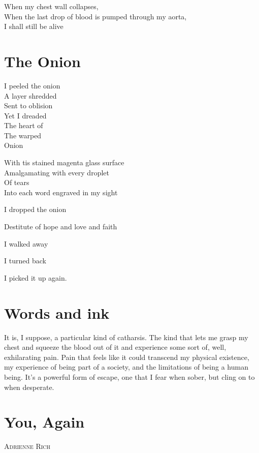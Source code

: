 \documentclass[parskip=full,12pt,oneside,openany,a5paper,numbers=endperiod]{scrbook}
\begin{document}
When my chest wall collapses,\\
When the last drop of blood is pumped through my aorta,\\
I shall still be alive

\chapter{The Onion}

I peeled the onion\\
A layer shredded\\
Sent to oblision\\
Yet I dreaded\\
The heart of\\
The warped\\
Onion

With tis stained magenta glass surface\\
Amalgamating with every droplet\\
Of tears\\
Into each word engraved in my sight

I dropped the onion

Destitute of hope and love and faith

I walked away

I turned back

I picked it up again.

\chapter{Words and ink}

It is, I suppose, a particular kind of catharsis. The kind that lets me grasp
my chest and squeeze the blood out of it and experience some sort of, well,
exhilarating pain. Pain that feels like it could transcend my physical
existence, my experience of being part of a society, and the limitations of
being a human being. It's a powerful form of escape, one that I fear when
sober, but cling on to when desperate.

\appendix

\chapter{You, Again}

{}\hfill\textsc{Adrienne Rich}

\end{document}
